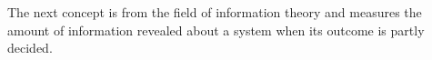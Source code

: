 The next concept is from the field of information theory and measures the amount of information revealed about a system when its outcome is partly decided.

